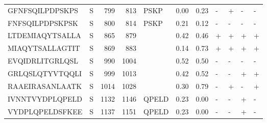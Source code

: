 \begin{tabular}{llrrlrrllll}
GFNFSQILPDPSKPS &       S &    799 &   813 &                PSKP &            0.00 &             0.23 &      - &       + &      - &       - \\
FNFSQILPDPSKPSK &       S &    800 &   814 &                PSKP &            0.21 &             0.12 &      - &       - &      - &       - \\
LTDEMIAQYTSALLA &       S &    865 &   879 &                     &            0.42 &             0.46 &      + &       + &      + &       + \\
MIAQYTSALLAGTIT &       S &    869 &   883 &                     &            0.14 &             0.73 &      + &       + &      + &       + \\
EVQIDRLITGRLQSL &       S &    990 &  1004 &                     &            0.52 &             0.50 &      - &       - &      - &       - \\
GRLQSLQTYVTQQLI &       S &    999 &  1013 &                     &            0.42 &             0.52 &      - &       - &      + &       + \\
RAAEIRASANLAATK &       S &   1014 &  1028 &                     &            0.30 &             0.79 &      - &       + &      - &       + \\
IVNNTVYDPLQPELD &       S &   1132 &  1146 &               QPELD &            0.23 &             0.00 &      - &       - &      + &       - \\
VYDPLQPELDSFKEE &       S &   1137 &  1151 &               QPELD &            0.23 &             0.00 &      - &       - &      + &       - \\
\bottomrule
\end{tabular}
